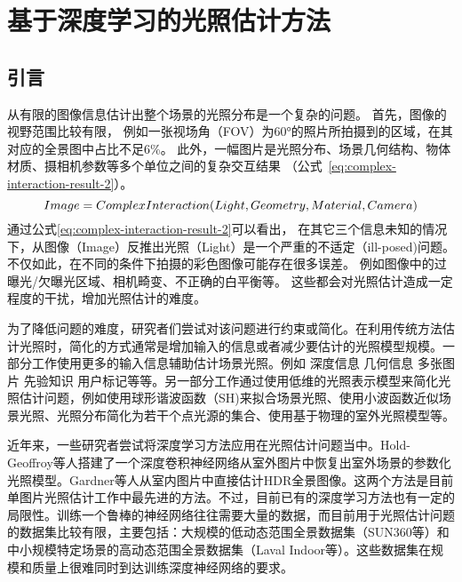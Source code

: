 \chapter{基于深度学习的光照估计方法}\label{chap:illumination-estimation}
\section{引言}
从有限的图像信息估计出整个场景的光照分布是一个复杂的问题。
首先，图像的视野范围比较有限，
例如一张视场角（FOV）为60°的照片所拍摄到的区域，在其对应的全景图中占比不足6\%。
此外，一幅图片是光照分布、场景几何结构、物体材质、摄相机参数等多个单位之间的复杂交互结果
（公式~\ref{eq:complex-interaction-result-2}）。
\begin{equation} \centering \label{eq:complex-interaction-result-2}
Image = ComplexInteraction(Light, Geometry, Material, Camera)\end{equation}
通过公式\ref{eq:complex-interaction-result-2}可以看出，
在其它三个信息未知的情况下，从图像（Image）反推出光照（Light）是一个严重的不适定（ill-posed)问题。
不仅如此，在不同的条件下拍摄的彩色图像可能存在很多误差。
例如图像中的过曝光/欠曝光区域、相机畸变、不正确的白平衡等。
这些都会对光照估计造成一定程度的干扰，增加光照估计的难度。

为了降低问题的难度，研究者们尝试对该问题进行约束或简化。在利用传统方法估计光照时，简化的方式通常是增加输入的信息或者减少要估计的光照模型规模。一部分工作使用更多的输入信息辅助估计场景光照。例如
深度信息\cite{knecht2012reciprocal,meilland20133d,zhang2016emptying,barron2013intrinsic}
几何信息\cite{ramamoorthi2001signal,sato2003illumination,li2003multiple}
多张图片\cite{sato1999acquiring,nishino2001determining,yu2006sparse}
先验知识\cite{nishino2004eyes,barron2015shape,lopez2010compositing}
用户标记\cite{lopez2010compositing,karsch2011rendering}等等。另一部分工作通过使用低维的光照表示模型来简化光照估计问题，例如使用球形谐波函数（SH)来拟合场景光照\cite{ramamoorthi2001signal,kemelmacher20113d,garrido2013reconstructing, knorr2014real,
li2014intrinsic,barron2015shape, rematas2016deep}、使用小波函数近似场景光照\cite{okabe2004spherical}、光照分布简化为若干个点光源的集合\cite{sato1999acquiring,  panagopoulos2011illumination, wang2002estimation, li2003multiple, sato2003illumination}、使用基于物理的室外光照模型\cite{lalonde2008does, lalonde2010sun, lalonde2012estimating, sunkavalli2008color}等。

近年来，一些研究者尝试将深度学习方法应用在光照估计问题当中。Hold-Geoffroy等人\cite{hold2017deep}搭建了一个深度卷积神经网络从室外图片中恢复出室外场景的参数化光照模型。Gardner等人\cite{gardner2017learning}从室内图片中直接估计HDR全景图像。这两个方法是目前单图片光照估计工作中最先进的方法。不过，目前已有的深度学习方法也有一定的局限性。训练一个鲁棒的神经网络往往需要大量的数据，而目前用于光照估计问题的数据集比较有限，主要包括：大规模的低动态范围全景数据集（SUN360\cite{xiao2012recognizing}等）和中小规模特定场景的高动态范围全景数据集（Laval Indoor等\cite{gardner2017learning}）。这些数据集在规模和质量上很难同时到达训练深度神经网络的要求。

